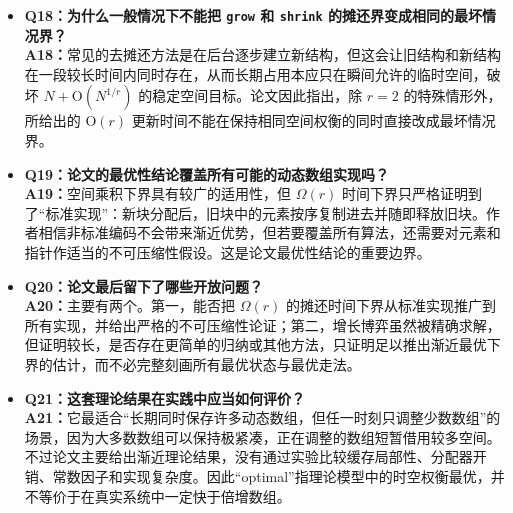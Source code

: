 \documentclass[UTF8,11pt,a4paper]{ctexart}
\newcommand{\op}[1]{\textnormal{\texttt{#1}}}
\newcommand{\Oh}{\mathrm{O}}
\begin{document}
\begin{itemize}[label={},leftmargin=0pt,itemsep=1.0em,topsep=0.5em]
  \item \textbf{Q18：为什么一般情况下不能把 \op{grow} 和 \op{shrink} 的摊还界变成相同的最坏情况界？}
  \\
  \textbf{A18：}常见的去摊还方法是在后台逐步建立新结构，但这会让旧结构和新结构在一段较长时间内同时存在，从而长期占用本应只在瞬间允许的临时空间，破坏 $N+\Oh(N^{1/r})$ 的稳定空间目标。论文因此指出，除 $r=2$ 的特殊情形外，所给出的 $\Oh(r)$ 更新时间不能在保持相同空间权衡的同时直接改成最坏情况界。

  \item \textbf{Q19：论文的最优性结论覆盖所有可能的动态数组实现吗？}
  \\
  \textbf{A19：}空间乘积下界具有较广的适用性，但 $\Omega(r)$ 时间下界只严格证明到了“标准实现”：新块分配后，旧块中的元素按序复制进去并随即释放旧块。作者相信非标准编码不会带来渐近优势，但若要覆盖所有算法，还需要对元素和指针作适当的不可压缩性假设。这是论文最优性结论的重要边界。

  \item \textbf{Q20：论文最后留下了哪些开放问题？}
  \\
  \textbf{A20：}主要有两个。第一，能否把 $\Omega(r)$ 的摊还时间下界从标准实现推广到所有实现，并给出严格的不可压缩性论证；第二，增长博弈虽然被精确求解，但证明较长，是否存在更简单的归纳或其他方法，只证明足以推出渐近最优下界的估计，而不必完整刻画所有最优状态与最优走法。

  \item \textbf{Q21：这套理论结果在实践中应当如何评价？}
  \\
  \textbf{A21：}它最适合“长期同时保存许多动态数组，但任一时刻只调整少数数组”的场景，因为大多数数组可以保持极紧凑，正在调整的数组短暂借用较多空间。不过论文主要给出渐近理论结果，没有通过实验比较缓存局部性、分配器开销、常数因子和实现复杂度。因此“optimal”指理论模型中的时空权衡最优，并不等价于在真实系统中一定快于倍增数组。

\end{itemize}
\end{document}
